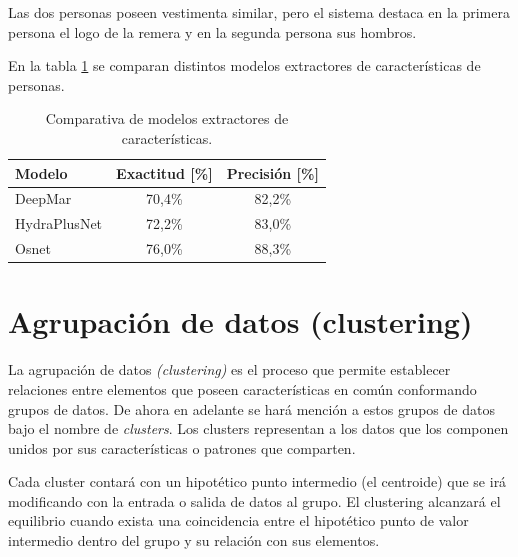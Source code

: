 
Las dos personas poseen vestimenta similar, pero el sistema destaca en la primera persona el logo de la remera y en la segunda persona sus hombros.

En la tabla \ref{tab:comparativaExtractores} se comparan distintos modelos extractores de características de personas.

\begin{table}[h]
	\centering
	\caption[Comparativa de modelos extractores de características]{Comparativa de modelos extractores de características.}
	\begin{tabular}{l c c}    
		\toprule
		\textbf{Modelo} & \textbf{Exactitud [\%]}  & \textbf{Precisión [\%]} \\
		\midrule
		DeepMar & 70,4\% & 82,2\% \\
		HydraPlusNet & 72,2\% & 83,0\% \\
		Osnet & 76,0\% & 88,3\% \\
		\bottomrule
		\hline
	\end{tabular}
	\label{tab:comparativaExtractores}
\end{table}

\newpage


\section{Agrupación de datos (clustering)}
\label{sec:clustering}

La agrupación de datos \textit{(clustering)} es el proceso que permite establecer relaciones entre elementos que poseen características en común conformando grupos de datos. De ahora en adelante se hará mención a estos grupos de datos bajo el nombre de \textit{clusters}. Los clusters representan a los datos que los componen  unidos por sus características o patrones que comparten.

Cada cluster contará con un hipotético punto intermedio (el centroide) que se irá modificando con la entrada o salida de datos al grupo. El clustering alcanzará el equilibrio cuando exista una coincidencia entre el hipotético punto de valor intermedio dentro del grupo y su relación con sus elementos. 

